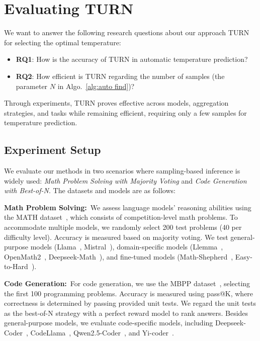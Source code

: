 \section{Evaluating \textsc{TURN}}
%


We want to answer the following research questions about our approach \textsc{TURN} for selecting the optimal temperature:
\begin{itemize}
    \item \textbf{RQ1}: How is the accuracy of TURN in automatic temperature prediction?
    \item \textbf{RQ2}: How efficient is TURN regarding the number of samples (the parameter $N$ in Algo.~\ref{alg:auto find})?
\end{itemize}
Through experiments, \textsc{TURN} proves effective across models, aggregation strategies, and tasks while remaining efficient, requiring only a few samples for temperature prediction.
\subsection{Experiment Setup}
We evaluate our methods in two scenarios where sampling-based inference is widely used: \emph{Math Problem Solving with Majority Voting} and \emph{Code Generation with Best-of-N}. The datasets and models are as follows:

\textbf{Math Problem Solving:}\ We assess language models’ reasoning abilities using the MATH dataset~\cite{hendrycks2021measuring}, which consists of competition-level math problems. To accommodate multiple models, we randomly select 200 test problems (40 per difficulty level). Accuracy is measured based on majority voting. We test general-purpose models (Llama~\cite{dubey2024llama}, Mistral~\cite{jiang2023mistral}), domain-specific models (Llemma~\cite{azerbayev2023llemma}, OpenMath2~\cite{toshniwal2024openmathinstruct}, Deepseek-Math~\cite{shao2024deepseekmath}), and fine-tuned models (Math-Shepherd~\cite{wang2024math}, Easy-to-Hard~\cite{sun2024easy}).

\textbf{Code Generation:}\ For code generation, we use the MBPP dataset~\cite{austin2021program}, selecting the first 100 programming problems. Accuracy is measured using pass@K, where correctness is determined by passing provided unit tests. We regard the unit tests as the best-of-N strategy with a perfect reward model to rank answers. Besides general-purpose models, we evaluate code-specific models, including Deepseek-Coder~\cite{guo2024deepseek}, CodeLlama~\cite{roziere2023code}, Qwen2.5-Coder~\cite{hui2024qwen2}, and Yi-coder~\cite{yicoder}.


